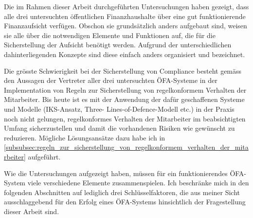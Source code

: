 \documentclass[10pt]{article}
\begin{document}
Die im Rahmen dieser Arbeit durchgeführten Untersuchungen haben gezeigt, dass alle drei untersuchten öffentlichen Finanzhaushalte über eine gut funktionierende Finanzaufsicht verfügen. Obschon sie grundsätzlich anders aufgebaut sind, weisen sie alle über die notwendigen Elemente und Funktionen auf, die für die Sicherstellung der Aufsicht benötigt werden. Aufgrund der unterschiedlichen dahinterliegenden Konzepte sind diese einfach anders organisiert und bezeichnet.

Die grösste Schwierigkeit bei der Sicherstellung von Compliance besteht gemäss den Aussagen der Vertreter aller drei untersuchten ÖFA-Systeme in der Implementation von Regeln zur Sicherstellung von regelkonformem Verhalten der Mitarbeiter. Bis heute ist es mit der Anwendung der dafür geschaffenen Systeme und Modelle (IKS-Ansatz, Three- Lines-of-Defence-Modell etc.) in der Praxis noch nicht gelungen, regelkonformes Verhalten der Mitarbeiter im beabsichtigten Umfang sicherzustellen und damit die vorhandenen Risiken wie gewünscht zu reduzieren. Mögliche Lösungsansätze dazu habe ich in \vref{subsubsec:regeln_zur_sicherstellung_von_regelkonformem_verhalten_der_mitarbeiter} aufgeführt.

Wie die Untersuchungen aufgezeigt haben, müssen für ein funktionierendes ÖFA-System viele verschiedene Elemente zusammenspielen. Ich beschränke mich in den folgenden Abschnitten auf lediglich drei Schlüsselfaktoren, die aus meiner Sicht ausschlaggebend für den Erfolg eines ÖFA-Systems hinsichtlich der Fragestellung dieser Arbeit sind.
\end{document}

